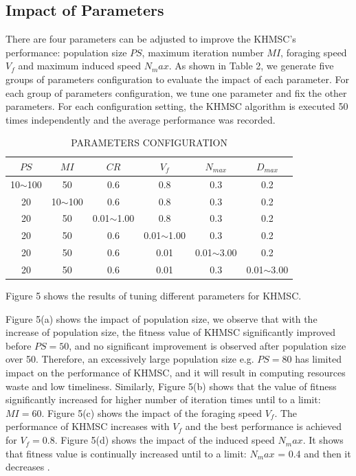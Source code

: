 \documentclass[10pt,journal,compsoc]{IEEEtran}
\begin{document}
\subsection{Impact of Parameters}
There are four parameters can be adjusted to improve the KHMSC's performance: population size $PS$, maximum iteration number $MI$, foraging speed $V_f$ and maximum induced speed $N_max$. As shown in Table 2, we generate five groups of parameters configuration to evaluate the impact of each parameter. For each group of parameters configuration, we tune one parameter and fix the other parameters. For each configuration setting, the KHMSC algorithm is executed 50 times independently and the average performance was recorded.

\begin{table}[!t]
\renewcommand{\arraystretch}{1.3}
\caption{PARAMETERS CONFIGURATION}
\label{table_example}
\centering
\begin{tabular}{cccccc}
\hline
\bfseries $PS$ & \bfseries $MI$ & \bfseries $CR$ & \bfseries $V_f$ & \bfseries $N_{max}$ & \bfseries $D_{max}$ \\
\hline
10$\sim$100 & 50          & 0.6            & 0.8            &  0.3            &  0.2 \\
20          & 10$\sim$100 & 0.6            & 0.8            &  0.3            &  0.2 \\
20          & 50          & 0.01$\sim$1.00 & 0.8            &  0.3            &  0.2 \\
20          & 50          & 0.6            & 0.01$\sim$1.00 &  0.3            &  0.2 \\
20          & 50          & 0.6            & 0.01           &  0.01$\sim$3.00 &  0.2 \\
20          & 50          & 0.6            & 0.01           &  0.3            &  0.01$\sim$3.00 \\
\hline
\end{tabular}
\end{table}

Figure 5 shows the results of tuning different parameters for KHMSC. 

Figure 5(a) shows the impact of population size, we observe that with the increase of population size, the fitness value of KHMSC significantly improved before $PS=50$, and no significant improvement is observed after population size over 50. Therefore, an excessively large population size e.g. $PS=80$ has limited impact on the performance of KHMSC, and it will result in computing resources waste and low timeliness.
Similarly, Figure 5(b) shows that the value of fitness significantly increased for higher number of iteration times until to a limit: $MI = 60$. Figure 5(c) shows the impact of the foraging speed $V_f$. The performance of KHMSC increases with $V_f$ and the best performance is achieved for $V_f = 0.8$. Figure 5(d) shows the impact of the induced speed $N_max$. It shows that fitness value is continually increased until to a limit: $N_max$ = 0.4 and then it decreases . 
\end{document}
